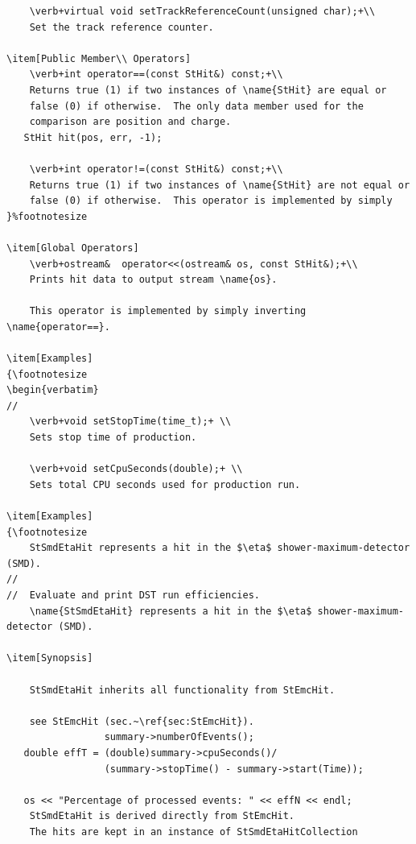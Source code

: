 {\begin{verbatim}
    \verb+virtual void setTrackReferenceCount(unsigned char);+\\
    Set the track reference counter.
    
\item[Public Member\\ Operators]
    \verb+int operator==(const StHit&) const;+\\
    Returns true (1) if two instances of \name{StHit} are equal or
    false (0) if otherwise.  The only data member used for the
    comparison are position and charge.
   StHit hit(pos, err, -1); 

    \verb+int operator!=(const StHit&) const;+\\
    Returns true (1) if two instances of \name{StHit} are not equal or
    false (0) if otherwise.  This operator is implemented by simply
}%footnotesize    

\item[Global Operators]
    \verb+ostream&  operator<<(ostream& os, const StHit&);+\\
    Prints hit data to output stream \name{os}.

    This operator is implemented by simply inverting \name{operator==}.

\item[Examples]
{\footnotesize
\begin{verbatim}
//
    \verb+void setStopTime(time_t);+ \\
    Sets stop time of production.

    \verb+void setCpuSeconds(double);+ \\
    Sets total CPU seconds used for production run.

\item[Examples]
{\footnotesize
    StSmdEtaHit represents a hit in the $\eta$ shower-maximum-detector (SMD).
//
//  Evaluate and print DST run efficiencies.
    \name{StSmdEtaHit} represents a hit in the $\eta$ shower-maximum-detector (SMD).
    
\item[Synopsis] 

    StSmdEtaHit inherits all functionality from StEmcHit.
    
    see StEmcHit (sec.~\ref{sec:StEmcHit}).
                 summary->numberOfEvents();
   double effT = (double)summary->cpuSeconds()/
                 (summary->stopTime() - summary->start(Time));
    
   os << "Percentage of processed events: " << effN << endl;
    StSmdEtaHit is derived directly from StEmcHit.
    The hits are kept in an instance of StSmdEtaHitCollection
\end{verbatim}
}%

